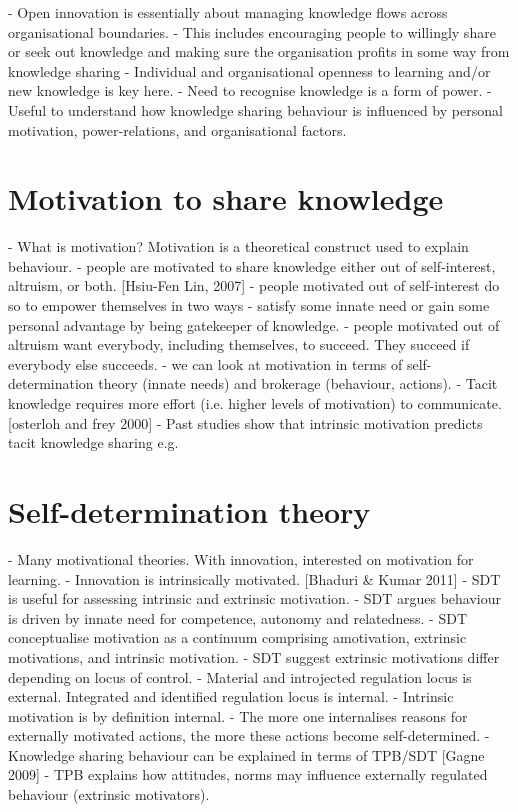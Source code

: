 

- Open innovation is essentially about managing knowledge flows across organisational boundaries.
- This includes encouraging people to willingly share or seek out knowledge and making sure the organisation profits in some way from knowledge sharing
- Individual and organisational openness to learning and/or new knowledge is key here.
- Need to recognise knowledge is a form of power.
- Useful to understand how knowledge sharing behaviour is influenced by personal motivation, power-relations, and organisational factors.



\section{Motivation to share knowledge}

- What is motivation? Motivation is a theoretical construct used to explain behaviour.
- people are motivated to share knowledge either out of self-interest, altruism, or both. [Hsiu-Fen Lin, 2007]
- people motivated out of self-interest do so to empower themselves in two ways - satisfy some innate need or gain some personal advantage by being gatekeeper of knowledge.
- people motivated out of altruism want everybody, including themselves, to succeed. They succeed if everybody else succeeds.
- we can look at motivation in terms of self-determination theory (innate needs) and brokerage (behaviour, actions).
- Tacit knowledge requires more effort (i.e. higher levels of motivation) to communicate.  [osterloh and frey 2000]
- Past studies show that intrinsic motivation predicts tacit knowledge sharing e.g. 

\section{Self-determination theory}


- Many motivational theories. With innovation, interested on motivation for learning. 
- Innovation is intrinsically motivated. [Bhaduri & Kumar 2011]
- SDT is useful for assessing intrinsic and extrinsic motivation.
- SDT argues behaviour is driven by innate need for competence, autonomy and relatedness.
- SDT conceptualise motivation as a continuum comprising amotivation, extrinsic motivations, and intrinsic motivation.
- SDT suggest extrinsic motivations differ depending on locus of control.
- Material and introjected regulation locus is external. Integrated and identified regulation locus is internal.
- Intrinsic motivation is by definition internal.
- The more one internalises reasons for externally motivated actions, the more these actions become self-determined.
- Knowledge sharing behaviour can be explained in terms of TPB/SDT [Gagne 2009]
- TPB explains how attitudes, norms may influence externally regulated behaviour (extrinsic motivators).

